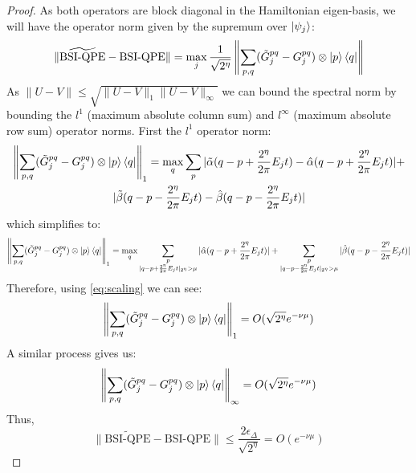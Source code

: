 \documentclass[aps,floatfix,10pt,amssymb,amsfont,amsmath,superscriptaddress,float,nofootinbib,longbibliography,nobalancelastpage,twocolumn]{revtex4-2}
\begin{document}
\begin{proof}
    As both operators are block diagonal in the Hamiltonian eigen-basis, we will have the operator norm given by the supremum over $\ket{\psi_j}$:
    \begin{equation}
        \|\widetilde{\text{BSI-QPE}}-\text{BSI-QPE}\| = \max_j\frac{1}{\sqrt{2^{\eta}}} 
        \left\|\sum_{p,q}(\tilde G^{pq}_j - G^{pq}_j) \otimes \ket{p}\bra{q}\right\|
    \end{equation}
    As $\|U-V\| \leq \sqrt{\|U-V\|_{1}\|U-V\|_{\infty}}$ we can bound the spectral norm by bounding the $l^1$ (maximum absolute column sum) and $l^{\infty}$ (maximum absolute row sum) operator norms. First the $l^1$ operator norm:
    \begin{multline}
         \left\|\sum_{p,q}(\tilde G^{pq}_j - G^{pq}_j) \otimes \ket{p}\bra{q}\right\|_1 = \max_q\sum_{p}|\tilde\alpha(q-p+\frac{2^{\eta}}{2\pi}E_jt)-\hat\alpha(q-p+\frac{2^{\eta}}{2\pi}E_jt)|+\\|\tilde\beta (q-p-\frac{2^{\eta}}{2\pi}E_jt)-\hat\beta (q-p-\frac{2^{\eta}}{2\pi}E_jt)|
    \end{multline}
    which simplifies to:
    \begin{equation}
         \left\|\sum_{p,q}(\tilde G^{pq}_j - G^{pq}_j) \otimes \ket{p}\bra{q}\right\|_1 = \max_q\sum_{\substack{p\\|q-p+\frac{2^{\eta}}{2\pi}E_jt|_{2^{\eta}}>\mu}}|\hat\alpha(q-p+\frac{2^{\eta}}{2\pi}E_jt)|+\sum_{\substack{p\\|q-p-\frac{2^{\eta}}{2\pi}E_jt|_{2^{\eta}}>\mu}}|\hat\beta (q-p-\frac{2^{\eta}}{2\pi}E_jt)|
    \end{equation}
    Therefore, using \eqref{eq:scaling} we can see:
    \begin{equation}
        \left\|\sum_{p,q}(\tilde G^{pq}_j - G^{pq}_j) \otimes \ket{p}\bra{q}\right\|_1 = O(\sqrt{2^{\eta}}e^{-\nu \mu})
    \end{equation}
    A similar process gives us:
    \begin{equation}
        \left\|\sum_{p,q}(\tilde G^{pq}_j - G^{pq}_j) \otimes \ket{p}\bra{q}\right\|_{\infty} =O(\sqrt{2^{\eta}}e^{-\nu \mu})
    \end{equation}
    Thus,
    \begin{equation}
        \|\widetilde{\text{BSI-QPE}}-\text{BSI-QPE}\| \leq \frac{2\epsilon_{\Delta}}{\sqrt{2^{\eta}}} = O\left(e^{-\nu \mu}\right)
    \end{equation}
\end{proof}
\end{document}

